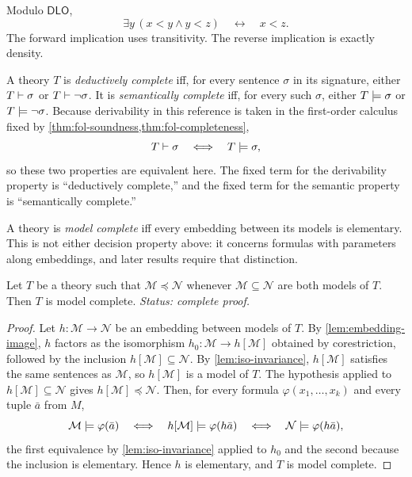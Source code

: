 \begin{example}
Modulo \(\mathsf{DLO}\),
\[
  \exists y\,(x<y\land y<z)
  \quad\longleftrightarrow\quad x<z.
\]
The forward implication uses transitivity.  The reverse implication is exactly
density.
\end{example}

\begin{definition}
\label{def:theory-completeness}
A theory \(T\) is \emph{deductively complete} iff, for every sentence
\(\sigma\) in its signature, either \(T\vdash\sigma\) or
\(T\vdash\neg\sigma\).  It is \emph{semantically complete} iff, for every
such \(\sigma\), either \(T\models\sigma\) or
\(T\models\neg\sigma\).  Because derivability in this reference is taken
in the
first-order calculus fixed by
\cref{thm:fol-soundness,thm:fol-completeness},
\[
  T\vdash\sigma\quad\Longleftrightarrow\quad T\models\sigma,
\]
so these two properties are equivalent here.  The fixed term for the
derivability property is ``deductively complete,'' and the fixed term for the
semantic property is ``semantically complete.''

A theory is \emph{model complete} iff every embedding between its models is
elementary.  This is not either decision property above: it concerns formulas
with parameters along embeddings, and later results require that distinction.
\end{definition}

\begin{lemma}
\label{lem:model-completeness-reduction}
Let \(T\) be a theory such that
\(\mathcal M\preccurlyeq\mathcal N\) whenever
\(\mathcal M\subseteq\mathcal N\) are both models of \(T\).  Then \(T\)
is model complete.
\textit{Status: complete proof.}
\end{lemma}
\begin{proof}
Let \(h:\mathcal M\to\mathcal N\) be an embedding between models of
\(T\).  By \cref{lem:embedding-image}, \(h\) factors as the isomorphism
\(h_0:\mathcal M\to h[\mathcal M]\) obtained by corestriction, followed
by the inclusion \(h[\mathcal M]\subseteq\mathcal N\).  By
\cref{lem:iso-invariance}, \(h[\mathcal M]\) satisfies the same sentences
as \(\mathcal M\), so \(h[\mathcal M]\) is a model of \(T\).  The
hypothesis applied to \(h[\mathcal M]\subseteq\mathcal N\) gives
\(h[\mathcal M]\preccurlyeq\mathcal N\).  Then, for every formula
\(\varphi(x_1,\ldots,x_k)\) and every tuple \(\bar a\) from \(M\),
\[
  \mathcal M\models\varphi(\bar a)
  \quad\Longleftrightarrow\quad
  h[\mathcal M]\models\varphi(h\bar a)
  \quad\Longleftrightarrow\quad
  \mathcal N\models\varphi(h\bar a),
\]
the first equivalence by \cref{lem:iso-invariance} applied to \(h_0\) and
the second because the inclusion is elementary.  Hence \(h\) is
elementary, and \(T\) is model complete.
\end{proof}

